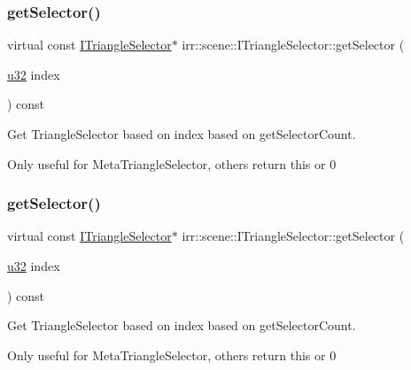 \subsubsection{\texorpdfstring{get\+Selector()}{getSelector()}\hspace{0.1cm}{\footnotesize\ttfamily [3/4]}}
{\footnotesize\ttfamily virtual const \hyperlink{classirr_1_1scene_1_1ITriangleSelector}{I\+Triangle\+Selector}$\ast$ irr\+::scene\+::\+I\+Triangle\+Selector\+::get\+Selector (\begin{DoxyParamCaption}\item[{\hyperlink{namespaceirr_a0416a53257075833e7002efd0a18e804}{u32}}]{index }\end{DoxyParamCaption}) const\hspace{0.3cm}{\ttfamily [pure virtual]}}



Get Triangle\+Selector based on index based on get\+Selector\+Count. 

Only useful for Meta\+Triangle\+Selector, others return \textquotesingle{}this\textquotesingle{} or 0 \mbox{\label{classirr_1_1scene_1_1ITriangleSelector_ad5d221ea393e67872c902d35e77fa69e}} 
\subsubsection{\texorpdfstring{get\+Selector()}{getSelector()}\hspace{0.1cm}{\footnotesize\ttfamily [4/4]}}
{\footnotesize\ttfamily virtual const \hyperlink{classirr_1_1scene_1_1ITriangleSelector}{I\+Triangle\+Selector}$\ast$ irr\+::scene\+::\+I\+Triangle\+Selector\+::get\+Selector (\begin{DoxyParamCaption}\item[{\hyperlink{namespaceirr_a0416a53257075833e7002efd0a18e804}{u32}}]{index }\end{DoxyParamCaption}) const\hspace{0.3cm}{\ttfamily [pure virtual]}}



Get Triangle\+Selector based on index based on get\+Selector\+Count. 

Only useful for Meta\+Triangle\+Selector, others return \textquotesingle{}this\textquotesingle{} or 0 \mbox{\label{classirr_1_1scene_1_1ITriangleSelector_ae0d51279cab70e31a6aa2646e3b05df4}} 
